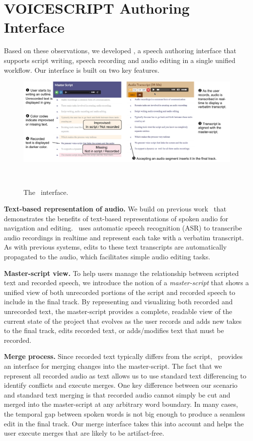 \section{VOICESCRIPT Authoring Interface}

Based on these observations, we developed \systemname, a speech authoring interface that supports script writing, speech recording and audio editing in a single unified workflow. Our interface is built on two key features.

\begin{figure}
  \centering
  \includegraphics[width=2.0\columnwidth]{figures/ui_aligned}
  \caption{The \systemname\ interface. }~\label{fig:ui_aligned}
\end{figure}

\textbf{Text-based representation of audio.} We build on previous work~\cite{casares2002simplifying,whittaker2004semantic,berthouzoz2012tools,rubin2013content} that demonstrates the benefits of text-based representations of spoken audio for navigation and editing. \systemname\ uses automatic speech recognition (ASR) to transcribe audio recordings in realtime and represent each take with a verbatim transcript. As with previous systems, edits to these text transcripts are automatically propagated to the audio, which facilitates simple audio editing tasks. 

\textbf{Master-script view.} To help users manage the relationship between scripted text and recorded speech, we introduce the notion of a \emph{master-script} that shows a unified view of both unrecorded portions of the script and recorded speech to include in the final track. By representing and visualizing both recorded and unrecorded text, the master-script provides a complete, readable view of the current state of the project that evolves as the user records and adds new takes to the final track, edits recorded text, or adds/modifies text that must be recorded. 

\textbf{Merge process.} Since recorded text typically differs from the script, \systemname\ provides an interface for merging changes into the master-script. The fact that we represent all recorded audio as text allows us to use standard text differencing to identify conflicts and execute merges. One key difference between our scenario and standard text merging is that recorded audio cannot simply be cut and merged into the master-script at any arbitrary word boundary. In many cases, the temporal gap between spoken words is not big enough to produce a seamless edit in the final track. Our merge interface takes this into account and helps the user execute merges that are likely to be artifact-free.

